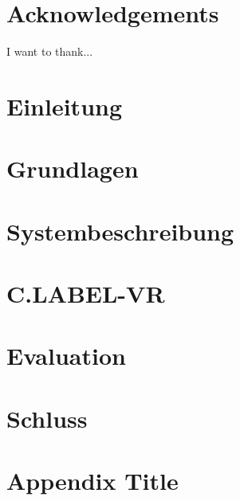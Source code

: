 \documentclass[12pt]{scrreprt}
\begin{document}
\chapter*{Acknowledgements}
I want to thank...
\newpage

\listoffigures





\chapter{Einleitung}


\chapter{Grundlagen}


\chapter{Systembeschreibung}
\label{sec:SystemComponents}


\chapter{C.LABEL-VR}
\label{sec:C.LABEL-VR}


\chapter{Evaluation}


\chapter{Schluss}




%


\appendix
\chapter{Appendix Title}
%





\end{document}
